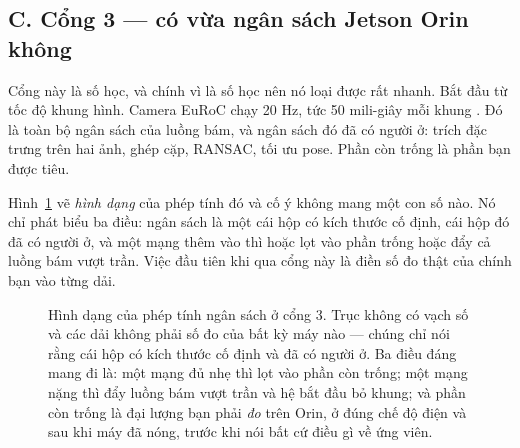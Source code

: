 \documentclass[../../deep_learning.tex]{subfiles}
\begin{document}
\subsection{C. Cổng 3 --- có vừa ngân sách Jetson Orin không}
Cổng này là số học, và chính vì là số học nên nó loại được rất nhanh. Bắt đầu từ tốc độ khung hình. Camera EuRoC chạy 20 Hz, tức 50 mili-giây mỗi khung \cite{burri2016euroc}. Đó là toàn bộ ngân sách của luồng bám, và ngân sách đó đã có người ở: trích đặc trưng trên hai ảnh, ghép cặp, RANSAC, tối ưu pose. Phần còn trống là phần bạn được tiêu.

Hình~\ref{fig:f27-ngan-sach} vẽ \emph{hình dạng} của phép tính đó và cố ý không mang một con số nào. Nó chỉ phát biểu ba điều: ngân sách là một cái hộp có kích thước cố định, cái hộp đó đã có người ở, và một mạng thêm vào thì hoặc lọt vào phần trống hoặc đẩy cả luồng bám vượt trần. Việc đầu tiên khi qua cổng này là điền số đo thật của chính bạn vào từng dải.

\begin{figure}[H]\centering
{}
\caption{Hình dạng của phép tính ngân sách ở cổng 3. Trục không có vạch số và các dải không phải số đo của bất kỳ máy nào --- chúng chỉ nói rằng cái hộp có kích thước cố định và đã có người ở. Ba điều đáng mang đi là: một mạng đủ nhẹ thì lọt vào phần còn trống; một mạng nặng thì đẩy luồng bám vượt trần và hệ bắt đầu bỏ khung; và phần còn trống là đại lượng bạn phải \emph{đo} trên Orin, ở đúng chế độ điện và sau khi máy đã nóng, trước khi nói bất cứ điều gì về ứng viên.}
\label{fig:f27-ngan-sach}
\end{figure}
\end{document}
